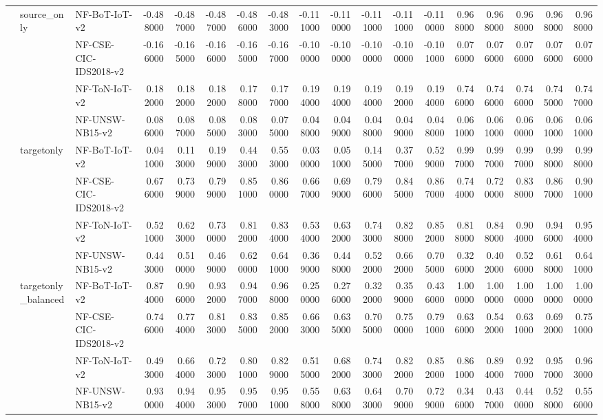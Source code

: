 \begin{tabular}{lllrrrrrrrrrrrrrrr}
\cline{2-18}
 & \multirow[t]{4}{*}{source_only} & NF-BoT-IoT-v2 & -0.488000 & -0.487000 & -0.487000 & -0.486000 & -0.483000 & -0.111000 & -0.110000 & -0.111000 & -0.111000 & -0.110000 & 0.968000 & 0.968000 & 0.968000 & 0.968000 & 0.968000 \\
 &  & NF-CSE-CIC-IDS2018-v2 & -0.166000 & -0.165000 & -0.166000 & -0.165000 & -0.167000 & -0.100000 & -0.100000 & -0.100000 & -0.100000 & -0.101000 & 0.076000 & 0.076000 & 0.076000 & 0.076000 & 0.076000 \\
 &  & NF-ToN-IoT-v2 & 0.182000 & 0.182000 & 0.182000 & 0.178000 & 0.177000 & 0.194000 & 0.194000 & 0.194000 & 0.192000 & 0.194000 & 0.746000 & 0.746000 & 0.746000 & 0.745000 & 0.747000 \\
 &  & NF-UNSW-NB15-v2 & 0.086000 & 0.087000 & 0.085000 & 0.083000 & 0.075000 & 0.048000 & 0.049000 & 0.048000 & 0.049000 & 0.048000 & 0.061000 & 0.061000 & 0.060000 & 0.061000 & 0.061000 \\
\cline{2-18}
 & \multirow[t]{4}{*}{targetonly} & NF-BoT-IoT-v2 & 0.041000 & 0.113000 & 0.199000 & 0.443000 & 0.553000 & 0.030000 & 0.051000 & 0.145000 & 0.377000 & 0.529000 & 0.997000 & 0.997000 & 0.997000 & 0.998000 & 0.998000 \\
 &  & NF-CSE-CIC-IDS2018-v2 & 0.676000 & 0.739000 & 0.799000 & 0.851000 & 0.860000 & 0.667000 & 0.699000 & 0.796000 & 0.845000 & 0.867000 & 0.744000 & 0.720000 & 0.838000 & 0.867000 & 0.901000 \\
 &  & NF-ToN-IoT-v2 & 0.521000 & 0.623000 & 0.730000 & 0.812000 & 0.834000 & 0.534000 & 0.632000 & 0.743000 & 0.828000 & 0.852000 & 0.818000 & 0.848000 & 0.904000 & 0.946000 & 0.954000 \\
 &  & NF-UNSW-NB15-v2 & 0.443000 & 0.510000 & 0.469000 & 0.620000 & 0.641000 & 0.369000 & 0.448000 & 0.522000 & 0.662000 & 0.705000 & 0.326000 & 0.402000 & 0.526000 & 0.618000 & 0.641000 \\
\cline{2-18}
 & \multirow[t]{4}{*}{targetonly_balanced} & NF-BoT-IoT-v2 & 0.874000 & 0.906000 & 0.932000 & 0.947000 & 0.968000 & 0.250000 & 0.276000 & 0.322000 & 0.359000 & 0.436000 & 1.000000 & 1.000000 & 1.000000 & 1.000000 & 1.000000 \\
 &  & NF-CSE-CIC-IDS2018-v2 & 0.746000 & 0.774000 & 0.813000 & 0.835000 & 0.852000 & 0.663000 & 0.635000 & 0.705000 & 0.750000 & 0.791000 & 0.636000 & 0.542000 & 0.631000 & 0.692000 & 0.751000 \\
 &  & NF-ToN-IoT-v2 & 0.493000 & 0.664000 & 0.723000 & 0.801000 & 0.829000 & 0.515000 & 0.682000 & 0.743000 & 0.822000 & 0.852000 & 0.861000 & 0.894000 & 0.927000 & 0.957000 & 0.963000 \\
 &  & NF-UNSW-NB15-v2 & 0.930000 & 0.944000 & 0.953000 & 0.957000 & 0.951000 & 0.558000 & 0.638000 & 0.643000 & 0.709000 & 0.729000 & 0.346000 & 0.437000 & 0.440000 & 0.528000 & 0.556000 \\
\cline{1-18} \cline{2-18}
\bottomrule
\end{tabular}
